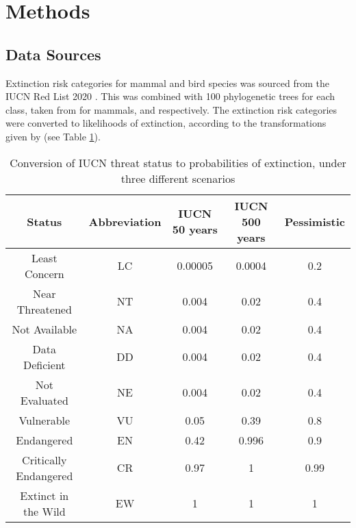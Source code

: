 \documentclass[10pt]{article}
\begin{document}
	
	
	
	\section{Methods}
	\subsection{Data Sources}
	Extinction risk categories for mammal and bird species was sourced from the IUCN Red List 2020 \citep{iucnIUCNRedList2021, iucnIUCNRedList2012}. This was combined with 100 phylogenetic trees for each class, taken from \citet{uphamInferringMammalTree2019}
	for mammals, and \citet{jetzGlobalDiversityBirds2012} respectively.
	 The extinction risk categories were converted to likelihoods of extinction, according to the transformations given by \citep{mooersConvertingEndangeredSpecies2008} (see Table \ref{ext_prob}).
	
	\begin{table}[b]
		\begin{tabular}{|c|c c c c|}
			\hline
			Status & Abbreviation & IUCN 50 years & IUCN 500 years & Pessimistic \\
			\hline
			Least Concern & LC & 0.00005 & 0.0004 & 0.2 \\
			Near Threatened & NT & 0.004 & 0.02 & 0.4 \\
			Not Available & NA & 0.004 & 0.02 & 0.4 \\
			Data Deficient & DD & 0.004 & 0.02 & 0.4 \\
			Not Evaluated & NE & 0.004 & 0.02 & 0.4 \\
			Vulnerable & VU & 0.05 & 0.39 & 0.8 \\
			Endangered & EN & 0.42 & 0.996 & 0.9 \\
			Critically Endangered & CR & 0.97 & 1 & 0.99 \\
			Extinct in the Wild & EW & 1 & 1 & 1 \\
			\hline
		\end{tabular}
		\caption{Conversion of IUCN threat status to probabilities of extinction, under three
			different scenarios \citep{mooersConvertingEndangeredSpecies2008}}\label{ext_prob}
	\end{table}
\end{document}
